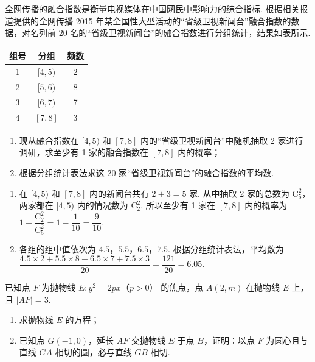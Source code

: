 \begin{problem}
全网传播的融合指数是衡量电视媒体在中国网民中影响力的综合指标. 根据相关报道提供的全网传播 2015 年某全国性大型活动的“省级卫视新闻台”融合指数的数据，对名列前 20 名的“省级卫视新闻台”的融合指数进行分组统计，结果如表所示.

\begin{center}
\begin{tabular}{|c|c|c|}
\hline
组号 & 分组 & 频数 \\
\hline
1 & \([4,5)\) & 2 \\
2 & \([5,6)\) & 8 \\
3 & \([6,7)\) & 7 \\
4 & \([7,8]\) & 3 \\
\hline
\end{tabular}
\end{center}

\begin{enumerate}
\item 现从融合指数在 \([4, 5)\) 和 \([7, 8]\) 内的“省级卫视新闻台”中随机抽取 2 家进行调研，求至少有 1 家的融合指数在 \([7, 8]\) 内的概率；
\item 根据分组统计表法求这 20 家“省级卫视新闻台”的融合指数的平均数.
\end{enumerate}
\end{problem}

\begin{solution}
\begin{enumerate}
\item 在 \([4,5)\) 和 \([7,8]\) 内的新闻台共有 \(2+3=5\) 家. 从中抽取 2 家的总数为 \(\mathrm C_5^2\)，两家都在 \([4,5)\) 内的情况数为 \(\mathrm C_2^2\). 所以至少有 1 家在 \([7,8]\) 内的概率为
\(1-\dfrac{\mathrm C_2^2}{\mathrm C_5^2}=1-\dfrac{1}{10}=\dfrac9{10}\).
\item 各组的组中值依次为 \(4.5\)，\(5.5\)，\(6.5\)，\(7.5\). 根据分组统计表法，平均数为
\(\dfrac{4.5\times2+5.5\times8+6.5\times7+7.5\times3}{20}=\dfrac{121}{20}=6.05\).
\end{enumerate}
\end{solution}

\begin{problem}
已知点 \(F\) 为抛物线 \(E: y^{2} = 2px\)（\(p > 0\)） 的焦点，点 \(A(2, m)\) 在抛物线 \(E\) 上，且 \(|AF| = 3\).

\begin{enumerate}
\item 求抛物线 \(E\) 的方程；
\item 已知点 \(G(-1,0)\)，延长 \(AF\) 交抛物线 \(E\) 于点 \(B\)，证明：以点 \(F\) 为圆心且与直线 \(GA\) 相切的圆，必与直线 \(GB\) 相切.
\end{enumerate}

\end{problem}

